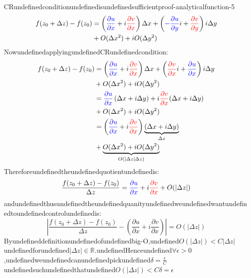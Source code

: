 \begin{mystthmproof}{CRundefinedconditionundefinedisundefinedsufficient}{proof-analyticalfunction-5}
\begin{equation}
\begin{aligned}
f(z_0+\Delta z)-f(z_0) &=  \left(\textcolor{blue}{\frac{\partial u}{\partial x}}+i\textcolor{red}{\frac{\partial v}{\partial x}}\right)\Delta x+\left(\textcolor{blue}{-\frac{\partial u}{\partial y}}i + \textcolor{red}{\frac{\partial v}{\partial y}}\right)i\Delta y\\ &+ O(\Delta x^2)+iO(\Delta y^2)
\end{aligned}
\end{equation}
NowundefinedapplyingundefinedCRundefinedcondition:
\begin{equation}
\begin{aligned}
f(z_0+\Delta z)-f(z_0) &=  \left(\textcolor{blue}{\frac{\partial u}{\partial x}}+i\textcolor{red}{\frac{\partial v}{\partial x}}\right)\Delta x+\left(\textcolor{red}{\frac{\partial v}{\partial x}}i + \textcolor{blue}{\frac{\partial u}{\partial x}}\right)i\Delta y\\ &+ O(\Delta x^2)+iO(\Delta y^2)  \\
&= \textcolor{blue}{\frac{\partial u}{\partial x}}\left(\Delta x + i\Delta y\right) + i\textcolor{red}{\frac{\partial v}{\partial x}}(\Delta x+i\Delta y)
\\ &+ O(\Delta x^2)+iO(\Delta y^2) \\
&= \left(\textcolor{blue}{\frac{\partial u}{\partial x}} + i\textcolor{red}{\frac{\partial v}{\partial x}}\right)\underbrace{(\Delta x +i\Delta y)}_{\Delta z}\\
&+ \underbrace{O(\Delta x^2)+iO(\Delta y^2)}_{O(|\Delta z|\Delta z)} \\
\end{aligned}
\end{equation}
Thereforeundefinedtheundefinedquotientundefinedis:
\begin{equation}
\frac{f(z_0+\Delta z)-f(z_0)}{\Delta z} =\textcolor{blue}{\frac{\partial u}{\partial x}} + i\textcolor{red}{\frac{\partial v}{\partial x} }+O(|\Delta z|)
\end{equation}
andundefinedthusundefinedtheundefinedquanityundefinedweundefinedwantundefinedtoundefinedcontrolundefinedis:
\begin{equation}
\left| \frac{f(z_0+\Delta z)-f(z_0)}{\Delta z} - \left(\frac{\partial u}{\partial x} + i\frac{\partial v}{\partial x}\right) \right|=O(|\Delta z|)
\end{equation}
Byundefineddefinitionundefinedofundefinedbig-O,undefined$O(|\Delta z|)<C|\Delta z|$undefinedforundefined$|\Delta z|\in \mathbb{R}$.undefinedHenceundefined$\forall \epsilon >0$,undefinedweundefinedcanundefinedpickundefined$\delta =\frac{\epsilon}{C}$undefinedsuchundefinedthatundefined$O(|\Delta z|)<C\delta =\epsilon$

\end{mystthmproof}
